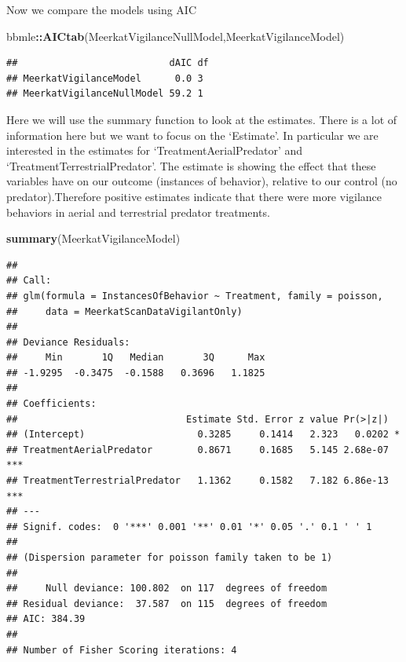 \documentclass[]{book}
\newenvironment{Shaded}{\begin{snugshade}}{\end{snugshade}}
\newcommand{\KeywordTok}[1]{\textcolor[rgb]{0.13,0.29,0.53}{\textbf{#1}}}
\newcommand{\NormalTok}[1]{#1}
\newcommand{\OperatorTok}[1]{\textcolor[rgb]{0.81,0.36,0.00}{\textbf{#1}}}
\begin{document}
Now we compare the models using AIC

\begin{Shaded}
\begin{Highlighting}[]
\NormalTok{bbmle}\OperatorTok{::}\KeywordTok{AICtab}\NormalTok{(MeerkatVigilanceNullModel,MeerkatVigilanceModel)}
\end{Highlighting}
\end{Shaded}

\begin{verbatim}
##                           dAIC df
## MeerkatVigilanceModel      0.0 3 
## MeerkatVigilanceNullModel 59.2 1
\end{verbatim}

Here we will use the summary function to look at the estimates. There is a lot of information here but we want to focus on the `Estimate'. In particular we are interested in the estimates for `TreatmentAerialPredator' and `TreatmentTerrestrialPredator'. The estimate is showing the effect that these variables have on our outcome (instances of behavior), relative to our control (no predator).Therefore positive estimates indicate that there were more vigilance behaviors in aerial and terrestrial predator treatments.

\begin{Shaded}
\begin{Highlighting}[]
\KeywordTok{summary}\NormalTok{(MeerkatVigilanceModel)}
\end{Highlighting}
\end{Shaded}

\begin{verbatim}
## 
## Call:
## glm(formula = InstancesOfBehavior ~ Treatment, family = poisson, 
##     data = MeerkatScanDataVigilantOnly)
## 
## Deviance Residuals: 
##     Min       1Q   Median       3Q      Max  
## -1.9295  -0.3475  -0.1588   0.3696   1.1825  
## 
## Coefficients:
##                              Estimate Std. Error z value Pr(>|z|)    
## (Intercept)                    0.3285     0.1414   2.323   0.0202 *  
## TreatmentAerialPredator        0.8671     0.1685   5.145 2.68e-07 ***
## TreatmentTerrestrialPredator   1.1362     0.1582   7.182 6.86e-13 ***
## ---
## Signif. codes:  0 '***' 0.001 '**' 0.01 '*' 0.05 '.' 0.1 ' ' 1
## 
## (Dispersion parameter for poisson family taken to be 1)
## 
##     Null deviance: 100.802  on 117  degrees of freedom
## Residual deviance:  37.587  on 115  degrees of freedom
## AIC: 384.39
## 
## Number of Fisher Scoring iterations: 4
\end{verbatim}
\end{document}
